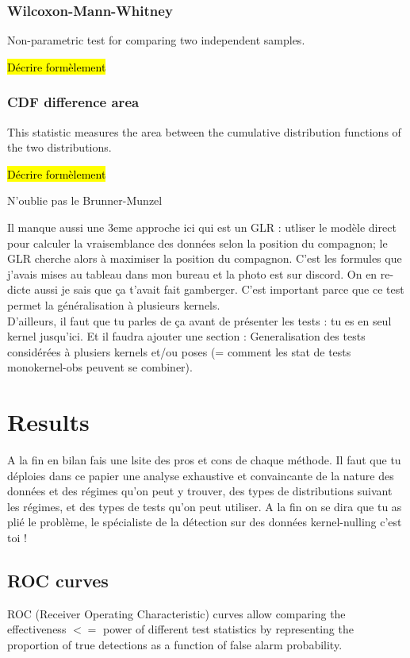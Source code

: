 \documentclass{article}
\newcommand{\dm}[1]{{\color{mulberry} #1}}
\begin{document}
\subsubsection{Wilcoxon-Mann-Whitney}
Non-parametric test for comparing two independent samples.

\hl{Décrire formèlement}

\subsubsection{CDF difference area}
This statistic measures the area between the cumulative distribution functions of the two distributions.

\hl{Décrire formèlement}

\dm{N'oublie pas le Brunner-Munzel}

\dm{Il manque aussi une 3eme approche  ici qui est un GLR : utliser le modèle direct pour calculer la vraisemblance des données selon la position du compagnon; le GLR cherche alors à maximiser la position du compagnon. C'est les formules que j'avais mises au tableau dans mon bureau et la photo est sur discord. On en re-dicte aussi je sais que ça t'avait fait gamberger. C'est important parce que ce test permet la généralisation à plusieurs kernels. \\
D'ailleurs, il faut que tu parles de ça avant de présenter les tests : tu es en seul kernel jusqu'ici. Et il faudra ajouter  une section : Generalisation des tests considérées à plusiers kernels et/ou poses (= comment les stat de tests monokernel-obs peuvent se combiner).}
\section{Results}

\dm{A la fin en bilan fais une lsite des pros et cons de chaque méthode. Il faut que tu déploies dans ce papier une analyse exhaustive et convaincante de la nature des données et des régimes qu'on peut y trouver, des types de distributions suivant les régimes, et des types de tests qu'on peut utiliser. A la fin on se dira que tu as plié le problème, le spécialiste de la détection sur des données kernel-nulling c'est toi !  }
\subsection{ROC curves}

ROC (Receiver Operating Characteristic) curves allow comparing the effectiveness \dm{$<=$ power } of different test statistics by representing the proportion of true detections as a function of false alarm probability.
\end{document}
